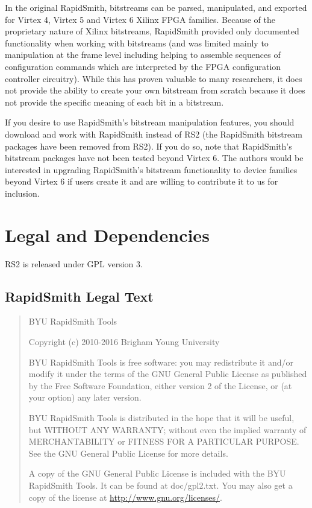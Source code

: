 \documentclass[12pt]{article}
\begin{document}
In the original RapidSmith, bitstreams can be parsed, manipulated, and exported
for Virtex 4, Virtex 5 and Virtex 6 Xilinx FPGA families.  Because of the
proprietary nature of Xilinx bitstreams, RapidSmith provided only documented
functionality when working with bitstreams (and was limited mainly to
manipulation at the frame level including helping to assemble sequences of
configuration commands which are interpreted by the FPGA configuration
controller circuitry).  While this has proven valuable to many researchers, it
does not provide the ability to create your own bitstream from scratch because
it does not provide the specific meaning of each bit in a bitstream.

If you desire to use RapidSmith's bitstream manipulation features, you should
download and work with RapidSmith instead of RS2 (the RapidSmith bitstream
packages have been removed from RS2).  If you do so, note that RapidSmith's
bitstream packages have not been tested beyond Virtex 6.  The authors would be
interested in upgrading RapidSmith's bitstream functionality to device families
beyond Virtex 6 if users create it and are willing to contribute it to us for
inclusion.

\section{Legal and Dependencies}
RS2 is released under GPL version 3.

\subsection{RapidSmith Legal Text}
\begin{quotation}
   BYU RapidSmith Tools

   Copyright (c) 2010-2016 Brigham Young University
   
   BYU RapidSmith Tools is free software: you may redistribute it
   and/or modify it under the terms of the GNU General Public License
   as published by the Free Software Foundation, either version 2 of
   the License, or (at your option) any later version.
   
   BYU RapidSmith Tools is distributed in the hope that it will be
   useful, but WITHOUT ANY WARRANTY; without even the implied warranty
   of MERCHANTABILITY or FITNESS FOR A PARTICULAR PURPOSE. See the GNU
   General Public License for more details.
   
   A copy of the GNU General Public License is included with the BYU
   RapidSmith Tools. It can be found at doc/gpl2.txt. You may also get
   a copy of the license at \url{http://www.gnu.org/licenses/}.
\end{quotation}
\end{document}
